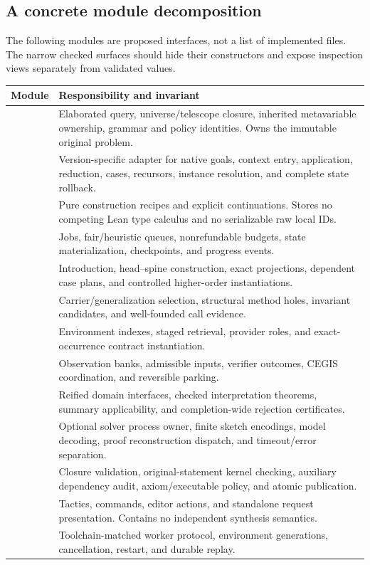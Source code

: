 \subsection{A concrete module decomposition}
The following modules are proposed interfaces, not a list of implemented files. The narrow checked surfaces should hide their constructors and expose inspection views separately from validated values.
\begin{longtable}{@{}L{0.29\textwidth}L{0.63\textwidth}@{}}
\toprule
Module & Responsibility and invariant \\
\midrule
\endhead
{} & Elaborated query, universe/telescope closure, inherited metavariable ownership, grammar and policy identities. Owns the immutable original problem. \\
 & Version-specific adapter for native goals, context entry, application, reduction, cases, recursors, instance resolution, and complete state rollback. \\
 & Pure construction recipes and explicit continuations. Stores no competing Lean type calculus and no serializable raw local IDs. \\
 & Jobs, fair/heuristic queues, nonrefundable budgets, state materialization, checkpoints, and progress events. \\
 & Introduction, head--spine construction, exact projections, dependent case plans, and controlled higher-order instantiations. \\
 & Carrier/generalization selection, structural method holes, invariant candidates, and well-founded call evidence. \\
 & Environment indexes, staged retrieval, provider roles, and exact-occurrence contract instantiation. \\
 & Observation banks, admissible inputs, verifier outcomes, CEGIS coordination, and reversible parking. \\
 & Reified domain interfaces, checked interpretation theorems, summary applicability, and completion-wide rejection certificates. \\
 & Optional solver process owner, finite sketch encodings, model decoding, proof reconstruction dispatch, and timeout/error separation. \\
 & Closure validation, original-statement kernel checking, auxiliary dependency audit, axiom/executable policy, and atomic publication. \\
 & Tactics, commands, editor actions, and standalone request presentation. Contains no independent synthesis semantics. \\
 & Toolchain-matched worker protocol, environment generations, cancellation, restart, and durable replay. \\
\bottomrule
\end{longtable}

